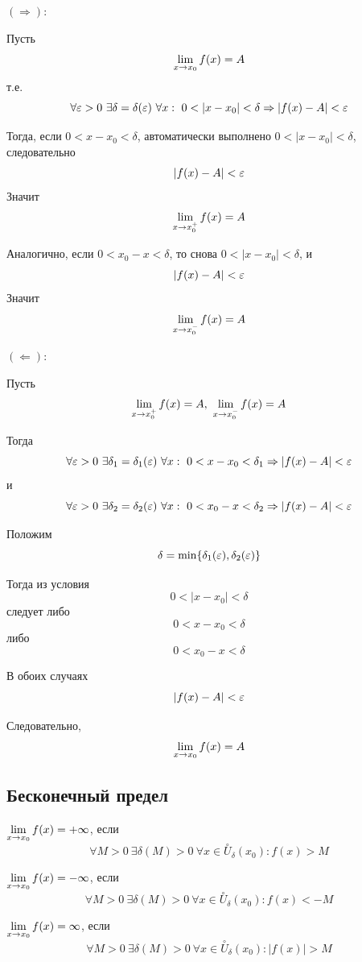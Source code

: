 \begin{Proof}

    {\bf $(\Rightarrow):$}

    Пусть 
    \[
        \lim\limits_{x \to x_0} f(x) = A
    \]
    т.е.
    \[
        \forall \eps > 0\ \exists \delta = \delta(\eps )\ 
        \forall x:\ 0 < |x - x_0| < \delta \Rightarrow |f(x) - A| < \eps
    \]

    Тогда, если $0 < x - x_0 < \delta$, автоматически выполнено
    $0 < |x - x_0| < \delta$, следовательно
    \[
        |f(x) - A| < \varepsilon
    \]
    Значит
    \[
        \lim\limits_{x \to x_0^+} f(x) = A
    \]

    Аналогично, если $0 < x_0 - x < \delta$, то снова
    $0 < |x - x_0| < \delta$, и
    \[
        |f(x) - A| < \varepsilon
    \]
    Значит
    \[
        \lim\limits_{x \to x_0^-} f(x) = A
    \]

    \bigskip

    {\bf $(\Leftarrow):$}

    Пусть
    \[
        \Lim{x}{x_0^+} f(x) = A,\ 
        \Lim{x}{x_0^-} f(x) = A
    \]

    Тогда
    \[
        \forall \eps > 0\ 
        \exists \delta_1 = \delta_1(\eps )\ 
        \forall x:\ 0 < x - x_0 < \delta_1 \Rightarrow 
        |f(x) - A| < \eps
    \]
    и
    \[
        \forall \eps > 0\ 
        \exists \delta_2 = \delta_2(\eps )\ 
        \forall x:\ 0 < x_0 - x < \delta_2 \Rightarrow 
        |f(x) - A| < \eps
    \]

    Положим
    \[
        \delta = \min\{\delta_1(\varepsilon ), \delta_2(\varepsilon )\}
    \]

    Тогда из условия
    \[
        0 < |x - x_0| < \delta
    \]
    следует либо
    \[
        0 < x - x_0 < \delta
    \]
    либо
    \[
        0 < x_0 - x < \delta
    \]

    В обоих случаях
    \[
        |f(x) - A| < \varepsilon
    \]

    Следовательно,
    \[
        \lim\limits_{x \to x_0} f(x) = A
    \]

\end{Proof}

\subsection{Бесконечный предел}

\begin{definition}
$\lim\limits_{x \to x_0} f(x) = +\infty $, если 
\[
    \forall M > 0\ \exists \delta (M) > 0\ \forall x \in \overset{\circ}{U}_{\delta }(x_0) : f(x) > M
\]
\end{definition}

\begin{definition}
$\lim\limits_{x \to x_0} f(x) = -\infty $, если 
\[
    \forall M > 0\ \exists \delta (M) > 0\ \forall x \in \overset{\circ}{U}_{\delta }(x_0) : f(x) < -M
\]
\end{definition}

\begin{definition}
$\lim\limits_{x \to x_0} f(x) = \infty $, если 
\[
    \forall M > 0\ \exists \delta (M) > 0\ \forall x \in \overset{\circ}{U}_{\delta }(x_0) : |f(x)| > M
\]
\end{definition}
